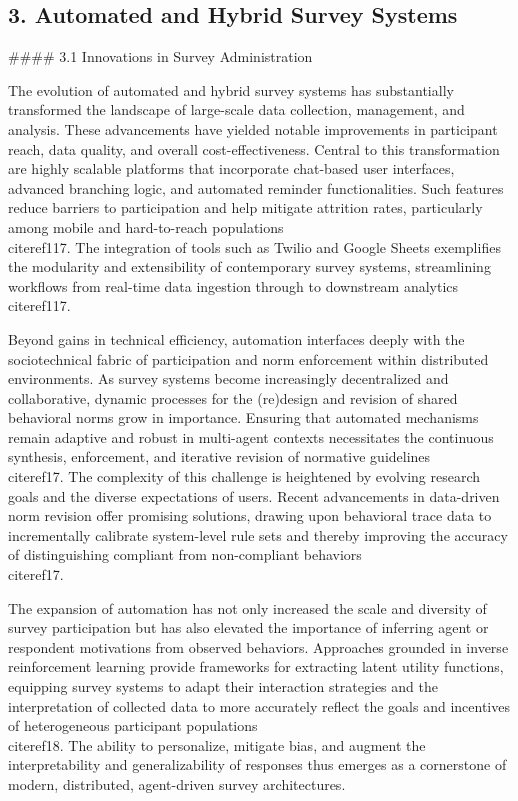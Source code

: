 \documentclass[11pt]{article}
\begin{document}
\subsection{3. Automated and Hybrid Survey Systems}

#### 3.1 Innovations in Survey Administration

The evolution of automated and hybrid survey systems has substantially transformed the landscape of large-scale data collection, management, and analysis. These advancements have yielded notable improvements in participant reach, data quality, and overall cost-effectiveness. Central to this transformation are highly scalable platforms that incorporate chat-based user interfaces, advanced branching logic, and automated reminder functionalities. Such features reduce barriers to participation and help mitigate attrition rates, particularly among mobile and hard-to-reach populations~\\cite{ref117}. The integration of tools such as Twilio and Google Sheets exemplifies the modularity and extensibility of contemporary survey systems, streamlining workflows from real-time data ingestion through to downstream analytics~\\cite{ref117}.

Beyond gains in technical efficiency, automation interfaces deeply with the sociotechnical fabric of participation and norm enforcement within distributed environments. As survey systems become increasingly decentralized and collaborative, dynamic processes for the (re)design and revision of shared behavioral norms grow in importance. Ensuring that automated mechanisms remain adaptive and robust in multi-agent contexts necessitates the continuous synthesis, enforcement, and iterative revision of normative guidelines~\\cite{ref17}. The complexity of this challenge is heightened by evolving research goals and the diverse expectations of users. Recent advancements in data-driven norm revision offer promising solutions, drawing upon behavioral trace data to incrementally calibrate system-level rule sets and thereby improving the accuracy of distinguishing compliant from non-compliant behaviors~\\cite{ref17}.

The expansion of automation has not only increased the scale and diversity of survey participation but has also elevated the importance of inferring agent or respondent motivations from observed behaviors. Approaches grounded in inverse reinforcement learning provide frameworks for extracting latent utility functions, equipping survey systems to adapt their interaction strategies and the interpretation of collected data to more accurately reflect the goals and incentives of heterogeneous participant populations~\\cite{ref18}. The ability to personalize, mitigate bias, and augment the interpretability and generalizability of responses thus emerges as a cornerstone of modern, distributed, agent-driven survey architectures.
\end{document}
